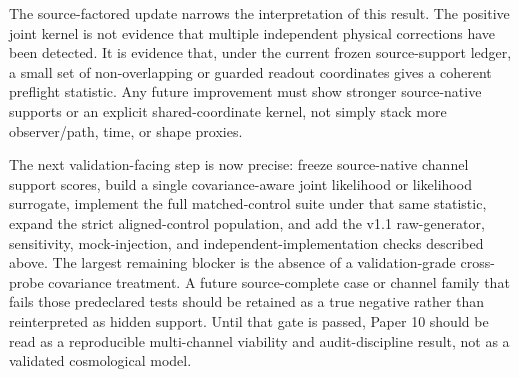 \documentclass[11pt]{article}
\begin{document}
The source-factored update narrows the interpretation of this result.  The
positive joint kernel is not evidence that multiple independent physical
corrections have been detected.  It is evidence that, under the current frozen
source-support ledger, a small set of non-overlapping or guarded readout
coordinates gives a coherent preflight statistic.  Any future improvement must
show stronger source-native supports or an explicit shared-coordinate kernel,
not simply stack more observer/path, time, or shape proxies.

The next validation-facing step is now precise: freeze source-native channel
support scores, build a single covariance-aware joint likelihood or likelihood
surrogate, implement the full matched-control suite under that same statistic,
expand the strict aligned-control population, and add the v1.1 raw-generator,
sensitivity, mock-injection, and independent-implementation checks described
above.  The largest remaining blocker is the absence of a validation-grade
cross-probe covariance treatment.  A future source-complete case or channel
family that fails those predeclared tests should be retained as a true negative
rather than reinterpreted as hidden support.  Until that gate is passed, Paper
10 should be read as a reproducible multi-channel viability and audit-discipline
result, not as a validated cosmological model.



\end{document}
